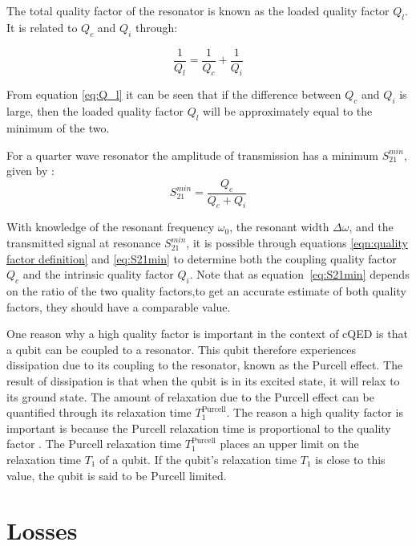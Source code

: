 The total quality factor of the resonator is known as the loaded quality factor $Q_l$. It is related to $Q_c$ and $Q_i$ through:

\begin{equation}
    \frac{1}{Q_l} = \frac{1}{Q_c} + \frac{1}{Q_i}
    \label{eq:Q_l}
\end{equation}

From equation \ref{eq:Q_l} it can be seen that if the difference between $Q_c$ and $Q_i$ is large, then the loaded quality factor $Q_l$ will be approximately equal to the minimum of the two.


For a quarter wave resonator the amplitude of transmission has a minimum $S_{21}^{min}$, given by \cite[p.~29]{Mazin}:
\begin{equation}
    S_{21}^{min} = \frac{Q_c}{Q_c + Q_i}
    \label{eq:S21min}
\end{equation}

With knowledge of the resonant frequency $\omega_0$, the resonant width $\Delta \omega$, and the transmitted signal at resonance $S_{21}^{min}$, it is possible through equations \ref{eqn:quality factor definition} and \ref{eq:S21min} to determine both the coupling quality factor $Q_c$ and the intrinsic quality factor $Q_i$. Note that as equation~\ref{eq:S21min} depends on the ratio of the two quality factors,to get an accurate estimate of both quality factors, they should have a comparable value.

One reason why a high quality factor is important in the context of cQED is that a qubit can be coupled to a resonator. This qubit therefore experiences dissipation due to its coupling to the resonator, known as the Purcell effect. The result of dissipation is that when the qubit is in its excited state, it will relax to its ground state. The amount of relaxation due to the Purcell effect can be quantified through its relaxation time $T_1^\text{Purcell}$. The reason a high quality factor is important is because the Purcell relaxation time is proportional to the quality factor \cite[p.~22]{Geerlings}. The Purcell relaxation time $T_1^\text{Purcell}$ places an upper limit on the relaxation time $T_1$ of a qubit. If the qubit's relaxation time $T_1$ is close to this value, the qubit is said to be Purcell limited.



\section{Losses}


